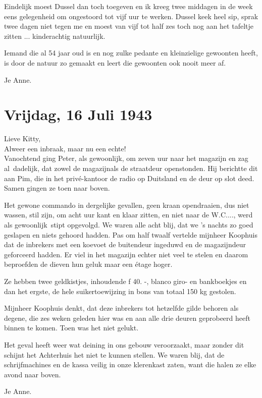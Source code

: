 \documentclass{book}
\begin{document}
Eindelijk moest Dussel dan toch toegeven en ik kreeg twee middagen in de week
eens gelegenheid om ongestoord tot vijf uur te werken. Dussel keek heel sip,
sprak twee dagen niet tegen me en moest van vijf tot half zes toch nog aan het
tafeltje zitten ... kinderachtig natuurlijk.

Iemand die al 54 jaar oud is en nog zulke pedante en kleinzielige gewoonten
heeft, is door de natuur zo gemaakt en leert die gewoonten ook nooit meer af.

Je Anne.

\section*{Vrijdag, 16 Juli 1943}

Lieve Kitty,\\
Alweer een inbraak, maar nu een echte!\\
Vanochtend ging Peter,
als gewoonlijk, om zeven uur naar het magazijn en zag al~dadelijk, dat zowel de
magazijnals de straatdeur openstonden. Hij berichtte dit aan Pim, die in het
privé-kantoor de radio op Duitsland en de deur op slot deed. Samen gingen ze
toen naar boven.

Het gewone commando in dergelijke gevallen, geen kraan opendraaien, dus niet
wassen, stil zijn, om acht uur kant en klaar zitten, en niet naar de W.C....,
werd als gewoonlijk~stipt opgevolgd. We waren alle acht blij, dat we 's nachts
zo goed geslapen en niets gehoord hadden. Pas om half twaalf vertelde mijnheer
Koophuis dat de inbrekers met een koevoet de buitendeur ingeduwd en de
magazijndeur geforceerd hadden. Er viel in het magazijn echter niet veel te
stelen en daarom beproefden de dieven hun geluk maar een étage hoger.

Ze hebben twee geldkistjes, inhoudende ƒ 40. -, blanco giro- en bankboekjes en
dan het ergste, de hele suikertoewijzing in bons van totaal 150 kg gestolen.

Mijnheer Koophuis denkt, dat deze inbrekers tot hetzelfde gilde behoren als
degene, die zes weken geleden hier was en aan alle drie deuren geprobeerd heeft
binnen te komen. Toen was het niet gelukt.

Het geval heeft weer wat deining in ons gebouw veroorzaakt, maar zonder dit
schijnt het Achterhuis het niet te kunnen stellen. We waren blij, dat de
schrijfmachines en de kassa veilig in onze klerenkast zaten, want die halen ze
elke avond naar boven.

Je Anne.
\end{document}
